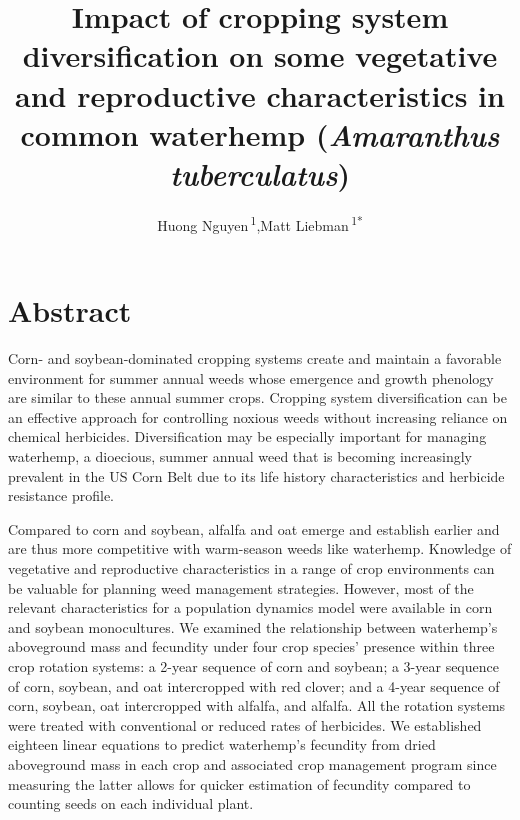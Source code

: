\documentclass[utf8]{frontiersSCNS}
\def\Authors{
Huong Nguyen\,\textsuperscript{1},Matt Liebman\,\textsuperscript{1*}}
\def\firstAuthorLast{NGUYEN {et~al.}}
\begin{document}
\onecolumn
{}
\title{Impact of cropping system diversification on some vegetative and reproductive characteristics in common waterhemp (\emph{Amaranthus tuberculatus})}
\author[\firstAuthorLast]{\Authors}
\address{} %
\correspondance{} %

\maketitle
\hypertarget{abstract}{%
\section*{Abstract}\label{abstract}}

Corn- and soybean-dominated cropping systems create and maintain a favorable environment for summer annual weeds whose emergence and growth phenology are similar to these annual summer crops. Cropping system diversification can be an effective approach for controlling noxious weeds without increasing reliance on chemical herbicides. Diversification may be especially important for managing waterhemp, a dioecious, summer annual weed that is becoming increasingly prevalent in the US Corn Belt due to its life history characteristics and herbicide resistance profile.

Compared to corn and soybean, alfalfa and oat emerge and establish earlier and are thus more competitive with warm-season weeds like waterhemp. Knowledge of vegetative and reproductive characteristics in a range of crop environments can be valuable for planning weed management strategies. However, most of the relevant characteristics for a population dynamics model were available in corn and soybean monocultures. We examined the relationship between waterhemp's aboveground mass and fecundity under four crop species' presence within three crop rotation systems: a 2-year sequence of corn and soybean; a 3-year sequence of corn, soybean, and oat intercropped with red clover; and a 4-year sequence of corn, soybean, oat intercropped with alfalfa, and alfalfa. All the rotation systems were treated with conventional or reduced rates of herbicides. We established eighteen linear equations to predict waterhemp's fecundity from dried aboveground mass in each crop and associated crop management program since measuring the latter allows for quicker estimation of fecundity compared to counting seeds on each individual plant.
\end{document}
